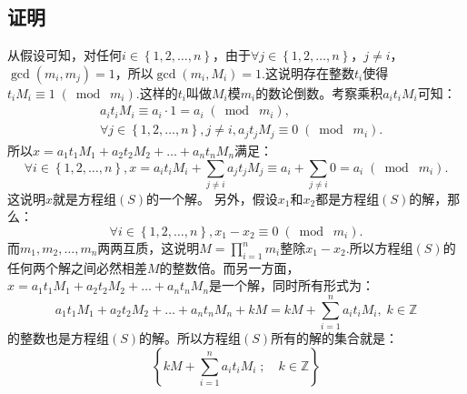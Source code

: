 \documentclass[UTF8]{ctexart}
\begin{document}
\subsection{证明}
从假设可知，对任何$i \in \left\{1,2,\ldots,n\right\}$，由于$\forall j \in \left\{1,2,\ldots,n\right\}$，$j \neq i$，$\gcd(m_i,m_j) = 1$，所以$\gcd(m_i,M_i) = 1.$这说明存在整数$t_i$使得$t_iM_i \equiv 1 \;(\bmod\;m_i).$这样的$t_i$叫做$M_i$模$m_i$的数论倒数。考察乘积$a_it_iM_i$可知：
\[
\begin{aligned}
    & a_it_iM_i \equiv a_i \cdot 1 = a_i \;(\bmod\;m_i), \\
    & \forall j \in \left\{1,2,\ldots,n\right\}, j \neq i, a_jt_jM_j \equiv 0 \;(\bmod\;m_i).
\end{aligned}
\]
所以$x = a_1t_1M_1 + a_2t_2M_2 + \ldots + a_nt_nM_n$满足：
\[ \forall i \in \left\{1,2,\ldots,n\right\}, x = a_it_iM_i + {\displaystyle \sum_{j \neq i} a_jt_jM_j} \equiv a_i + {\displaystyle \sum_{j \neq i} 0 = a_i \;(\bmod\;m_i).} \]
这说明$x$就是方程组$(S)$的一个解。
另外，假设$x_1$和$x_2$都是方程组$(S)$的解，那么：
\[ \forall i \in \left\{1,2,\ldots,n\right\}, x_1 - x_2 \equiv 0 \;(\bmod\;m_i). \]
而$m_1,m_2,\ldots,m_n$两两互质，这说明$M = {\displaystyle \prod_{i=1}^n m_i}$整除$x_1 - x_2.$所以方程组$(S)$的任何两个解之间必然相差$M$的整数倍。而另一方面，$x = a_1t_1M_1 + a_2t_2M_2 + \ldots + a_nt_nM_n$是一个解，同时所有形式为：
\[ a_1t_1M_1 + a_2t_2M_2 + \ldots + a_nt_nM_n + kM = kM + {\displaystyle \sum_{i=1}^n a_it_iM_i,\; k \in \mathbb{Z}} \]
的整数也是方程组$(S)$的解。所以方程组$(S)$所有的解的集合就是：
\[ \left\{kM + {\displaystyle \sum_{i=1}^n a_it_iM_i\;;\quad k \in \mathbb{Z}}\right\} \]
\end{document}
